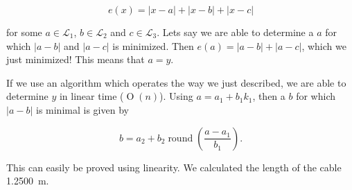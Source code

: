 \documentclass[11pt,titlepage]{report}
\begin{document}
\begin{equation}
	e(x) = |x-a|+|x-b|+|x-c|
\end{equation}

for some $a \in \mathcal{L}_1$, $b \in \mathcal{L}_2$ and $c \in \mathcal{L}_3$. Lets say we are able to determine a $a$ for which $|a-b|$ and $|a-c|$ is minimized. Then $e(a)=|a-b|+|a-c|$, which we just minimized! This means that $a=y$.

If we use an algorithm which operates the way we just described, we are able to determine $y$ in linear time ($\operatorname{O}(n)$). Using $a = a_1 + b_1 k_1$, then a $b$ for which $|a-b|$ is minimal is given by

\begin{equation}
	b=a_2+b_2 \operatorname{round}\left(\frac{a-a_1}{b_1}\right).
\end{equation}

This can easily be proved using linearity. We calculated the length of the cable \SI{1.2500}{m}.
\end{document}
